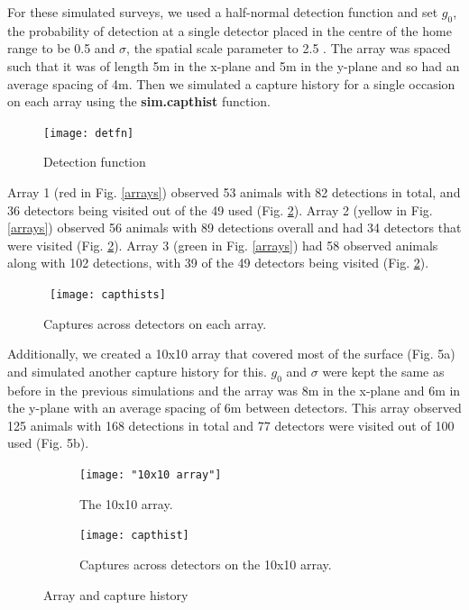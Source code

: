 \documentclass[a4paper,12pt]{article}
\begin{document}
For these simulated surveys, we used a half-normal detection function and set $g_0$, the probability of detection at a single detector placed in the centre of the home range to be 0.5 and $\sigma$, the spatial scale parameter to 2.5 \citep*{Efford2009}. The array was spaced such that it was of length 5m in the x-plane and 5m in the y-plane and so had an average spacing of 4m. Then we simulated a capture history for a single occasion on each array using the \textbf{sim.capthist} function.

\begin{figure}[H]
\centering
\texttt{[image: detfn]}
\caption{Detection function}
\label{detfn}
\end{figure}

Array 1 (red in Fig. \ref{arrays}) observed 53 animals with 82 detections in total, and 36 detectors being visited out of the 49 used (Fig. \ref{capthists}). Array 2 (yellow in Fig. \ref{arrays}) observed 56 animals with 89 detections overall and had 34 detectors that were visited (Fig. \ref{capthists}). Array 3 (green in Fig. \ref{arrays}) had 58 observed animals along with 102 detections, with 39 of the 49 detectors being visited (Fig. \ref{capthists}).

\begin{figure}[h]
\hbox{\hspace{-6em} \texttt{[image: capthists]}}
\caption{Captures across detectors on each array.}
\label{capthists}
\end{figure}

Additionally, we created a 10x10 array that covered most of the surface (Fig. 5a) and simulated another capture history for this. $g_0$ and $\sigma$ were kept the same as before in the previous simulations and the array was 8m in the x-plane and 6m in the y-plane with an average spacing of 6m between detectors. This array observed 125 animals with 168 detections in total and 77 detectors were visited out of 100 used (Fig. 5b).

\begin{figure}[h]
\centering
\begin{subfigure}[h]{0.4\textwidth}
\texttt{[image: "10x10 array"]}
\caption{The 10x10 array.}
\label{10x10}
\end{subfigure}
\begin{subfigure}[h]{0.4\textwidth}
\texttt{[image: capthist]}
\caption{Captures across detectors on the 10x10 array.}
\label{10x10 capt hist}
\end{subfigure}
\caption{Array and capture history}
\end{figure}
\end{document}
